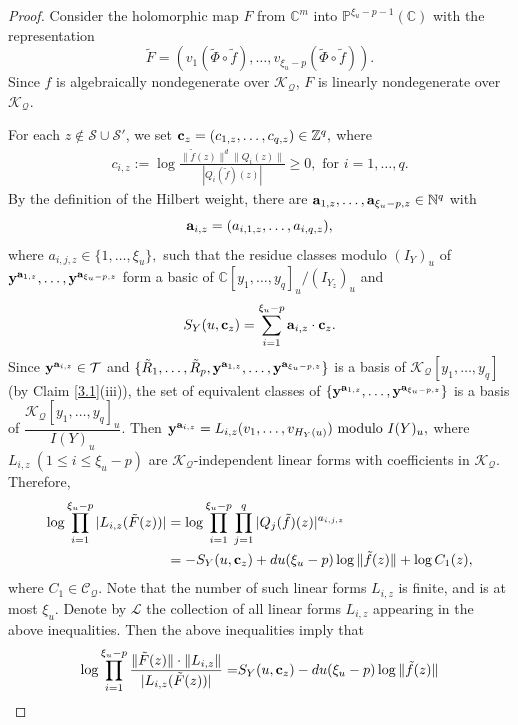 \documentclass[12pt,leqno]{amsart}
\newcommand{\C}{{\mathbb{C}}}
\renewcommand{\P}{{\mathbb{P}}}
\numberwithin{equation}{section}
\begin{document}
\begin{proof}
Consider the holomorphic map $F$ from $\C^m$ into $\P^{\xi_u-p-1}(\C)$ with the representation
$$ \tilde F=(v_1(\tilde\Phi\circ \tilde f),\ldots,v_{\xi_u-p}(\tilde\Phi\circ \tilde f)). $$
Since $f$ is algebraically nondegenerate over $\mathcal K_{\mathcal Q}$, $F$ is linearly nondegenerate over $\mathcal K_{\mathcal Q}$.

For each $z\not\in\mathcal S\cup\mathcal S'$, we set ${\bf c}_z = (c_{1,z},\ldots,c_{q,z})\in\mathbb Z^{q},$ where
\begin{align*}
c_{i,z}:=\log\frac{\|\tilde f(z)\|^d\|Q_i(z)\|}{|Q_i(\tilde f)(z)|}\ge 0, \text{ for } i=1,\ldots,q.
\end{align*}
By the definition of the Hilbert weight, there are ${\bf a}_{1,z},\ldots,{\bf a}_{\xi_u-p,z}\in\mathbb N^{q}$ with
$$ {\bf a}_{i,z}=(a_{i,1,z},\ldots,a_{i,q,z}), $$
where $a_{i,j,z}\in\{1,\ldots,\xi_u\},$ such that the residue classes modulo $(I_Y)_u$ of ${\bf y}^{{\bf a}_{1,z}},\ldots,{\bf y}^{{\bf a}_{\xi_u-p,z}}$ form a basic of $\C[y_1,\ldots,y_q]_u/(I_{Y_z})_u$ and
\begin{align*}
S_Y(u,{\bf c}_z)=\sum_{i=1}^{\xi_u-p}{\bf a}_{i,z}\cdot{\bf c}_z.
\end{align*}
Since ${\bf y}^{{\bf a}_{i,z}}\in\mathcal T$ and $\{\tilde R_1,\ldots,\tilde R_p,{\bf y}^{{\bf a}_{1,z}},\ldots,{\bf y}^{{\bf a}_{\xi_u-p,z}}\}$ is a basis of $\mathcal K_{\mathcal Q}[y_1,\ldots,y_q]$ (by Claim \ref{3.1}(iii)), the set of equivalent classes of $\{{\bf y}^{{\bf a}_{1,z}},\ldots,{\bf y}^{{\bf a}_{\xi_u-p,z}}\}$ is a basis of $\dfrac{\mathcal K_{\mathcal Q}[y_1,\ldots,y_q]_u}{I(Y)_u}$. Then $ {\bf y}^{{\bf a}_{i,z}}=L_{i,z}(v_1,\ldots,v_{H_Y(u)})\ \text{modulo }I(Y)_u, $ where $L_{i,z}\ (1\le i\le \xi_u-p)$ are $\mathcal K_{\mathcal Q}$-independent linear forms with coefficients in $\mathcal K_{\mathcal Q}$.
Therefore,
\begin{align*}
\log\prod_{i=1}^{\xi_u-p} |L_{i,z}(\tilde F(z))|&=\log\prod_{i=1}^{\xi_u-p}\prod_{j=1}^q|Q_j(\tilde f)(z)|^{a_{i,j,z}}\\
&= -S_Y(u,{\bf c}_z)+du(\xi_u-p)\log \|\tilde f(z)\| +\log C_1(z),
\end{align*}
where $C_1\in\mathcal C_{\mathcal Q}$. Note that the number of such linear forms $L_{i,z}$ is finite, and is at most $\xi_u$. Denote by $\mathcal L$ the collection of all linear forms $L_{i,z}$ appearing in the above inequalities. Then the above inequalities imply that
\begin{align*}
\log\prod_{i=1}^{\xi_u-p}\dfrac{\|\tilde F(z)\|\cdot \|L_{i,z}\|}{|L_{i,z}(\tilde F(z))|}= &S_Y(u,{\bf c}_z)-du(\xi_u-p)\log \|\tilde f(z)\| \\

\end{align*}
\end{proof}
\end{document}
